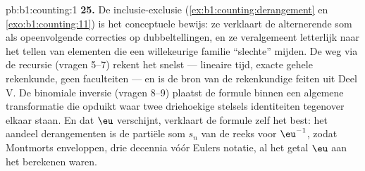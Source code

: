 \begin{solution}{pb:b1:counting:1}
\textbf{25.} De inclusie-exclusie (\cref{ex:b1:counting:derangement} en
\cref{exo:b1:counting:11}) is het conceptuele bewijs: ze verklaart de
alternerende som als opeenvolgende correcties op dubbeltellingen, en ze
veralgemeent letterlijk naar het tellen van elementen die een
willekeurige familie ``slechte''  mijden. De weg via de
recursie (vragen 5--7) rekent het snelst --- lineaire tijd, exacte
gehele rekenkunde, geen faculteiten --- en is de bron van de
rekenkundige feiten uit Deel V. De binomiale inversie (vragen 8--9)
plaatst de formule binnen een algemene transformatie die opduikt waar
twee driehoekige stelsels identiteiten tegenover elkaar staan. En dat
$\eu$ verschijnt, verklaart de formule zelf het best: het aandeel
derangementen is de partiële som $s_n$ van de reeks voor $\eu^{-1}$,
zodat Montmorts enveloppen, drie decennia vóór Eulers notatie, al het
getal $\eu$ aan het berekenen waren.
\end{solution}
